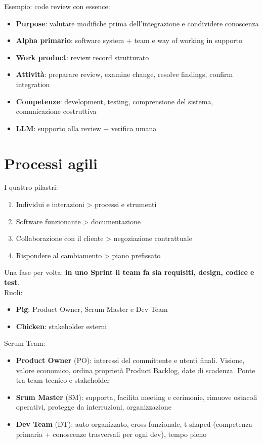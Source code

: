 \documentclass[12pt]{extarticle}
\begin{document}
\noindent Esempio: code review con essence:
\begin{itemize}
    \item \textbf{Purpose}: valutare modifiche prima dell'integrazione e condividere conoscenza
    \item \textbf{Alpha primario}: software system + team e way of working in supporto
    \item \textbf{Work product}: review record strutturato
    \item \textbf{Attività}: preparare review, examine change, resolve findings, confirm integration
    \item \textbf{Competenze}: development, testing, comprensione del sistema, comunicazione costruttiva
    \item \textbf{LLM}: supporto alla review + verifica umana
\end{itemize}

\section{Processi agili}
I quattro pilastri:
\begin{enumerate}
    \item Individui e interazioni > processi e strumenti
    \item Software funzionante > documentazione
    \item Collaborazione con il cliente > negoziazione contrattuale
    \item Rispondere al cambiamento > piano prefissato
\end{enumerate}

\noindent Una fase per volta: \textbf{in uno Sprint il team fa sia requisiti, design, codice e test}.\\

\noindent Ruoli:
\begin{itemize}
    \item \textbf{Pig}: Product Owner, Scrum Master e Dev Team
    \item \textbf{Chicken}: stakeholder esterni
\end{itemize}

\noindent Scrum Team:
\begin{itemize}
    \item \textbf{Product Owner} (PO): interessi del committente e utenti finali. Visione, valore economico, ordina proprietà Product Backlog, date di scadenza. Ponte tra team tecnico e stakeholder
    \item \textbf{Srum Master} (SM): supporta, facilita meeting e cerimonie, rimuove ostacoli operativi, protegge da interruzioni, organizzazione
    \item \textbf{Dev Team} (DT): auto-organizzato, cross-funzionale, t-shaped (competenza primaria + conoscenze trasversali per ogni dev), tempo pieno
\end{itemize}
\end{document}
